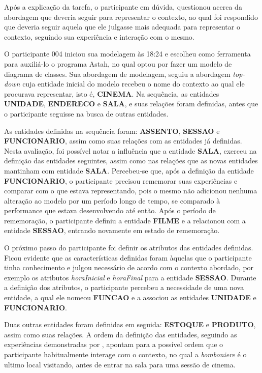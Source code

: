Após a explicação da tarefa, o participante em dúvida, questionou acerca da abordagem que deveria seguir para representar o contexto, ao qual foi respondido que deveria seguir aquela que ele julgasse mais adequada para representar o contexto, seguindo sua experiência e interação com o mesmo. 

O participante 004 iniciou sua modelagem às 18:24 e escolheu como ferramenta para auxiliá-lo o programa Astah, no qual optou por fazer um modelo de diagrama de classes. Sua abordagem de modelagem, seguiu a abordagem \textit{top-down} cuja entidade inicial do modelo recebeu o nome do contexto ao qual ele procurava representar, isto é, \textbf{CINEMA}. Na sequência, as entidades \textbf{UNIDADE}, \textbf{ENDERECO} e \textbf{SALA}, e suas relações foram definidas, antes que o participante seguisse na busca de outras entidades.

As entidades definidas na sequência foram: \textbf{ASSENTO}, \textbf{SESSAO} e \textbf{FUNCIONARIO}, assim como suas relações com as entidades já definidas. Nesta avaliação, foi possível notar a influência que a entidade \textbf{SALA}, exerceu na definição das entidades seguintes, assim como nas relações que as novas entidades mantinham com entidade \textbf{SALA}. Percebeu-se que, após a definição da entidade \textbf{FUNCIONARIO}, o participante precisou rememorar suas experiências e comparar com o que estava representando, pois o mesmo não adicionou nenhuma alteração ao modelo por um período longo de tempo, se comparado à performance que estava desenvolvendo até então. Após o período de rememoração, o participante definiu a entidade \textbf{FILME} e a relacionou com a entidade \textbf{SESSAO}, entrando novamente em estado de rememoração.

O próximo passo do participante foi definir os atributos das entidades definidas. Ficou evidente que as características definidas foram àquelas que o participante tinha conhecimento e julgou necessário de acordo com o contexto abordado, por exemplo os atributos \textit{horaInicial} e \textit{horaFinal} para a entidade \textbf{SESSAO}. Durante a definição dos atributos, o participante percebeu a necessidade de uma nova entidade, a qual ele nomeou \textbf{FUNCAO} e a associou as entidades \textbf{UNIDADE} e \textbf{FUNCIONARIO}. 

Duas outras entidades foram definidas em seguida: \textbf{ESTOQUE} e \textbf{PRODUTO}, assim como suas relações. A ordem da definição das entidades, seguindo as experiências demonstradas por \citet{rosch:1975.family}, apontam para a possível ordem que o participante habitualmente interage com o contexto, no qual a \textit{bomboniere} é o ultimo local visitando, antes de entrar na sala para uma sessão de cinema.

